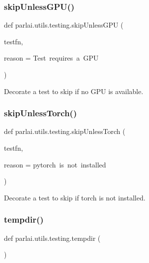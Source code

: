 \subsubsection{\texorpdfstring{skip\+Unless\+G\+P\+U()}{skipUnlessGPU()}}
{\footnotesize\ttfamily def parlai.\+utils.\+testing.\+skip\+Unless\+G\+PU (\begin{DoxyParamCaption}\item[{}]{testfn,  }\item[{}]{reason = {\ttfamily \textquotesingle{}Test~requires~a~GPU\textquotesingle{}} }\end{DoxyParamCaption})}

\begin{DoxyVerb}Decorate a test to skip if no GPU is available.
\end{DoxyVerb}
 \mbox{\label{namespaceparlai_1_1utils_1_1testing_a7b182622aebc6cdc41ee3b99ebe47432}} 
\subsubsection{\texorpdfstring{skip\+Unless\+Torch()}{skipUnlessTorch()}}
{\footnotesize\ttfamily def parlai.\+utils.\+testing.\+skip\+Unless\+Torch (\begin{DoxyParamCaption}\item[{}]{testfn,  }\item[{}]{reason = {\ttfamily \textquotesingle{}pytorch~is~not~installed\textquotesingle{}} }\end{DoxyParamCaption})}

\begin{DoxyVerb}Decorate a test to skip if torch is not installed.
\end{DoxyVerb}
 \mbox{\label{namespaceparlai_1_1utils_1_1testing_a0945b769a10c0c844b29c02ff26445a5}} 
\subsubsection{\texorpdfstring{tempdir()}{tempdir()}}
{\footnotesize\ttfamily def parlai.\+utils.\+testing.\+tempdir (\begin{DoxyParamCaption}{ }\end{DoxyParamCaption})}

